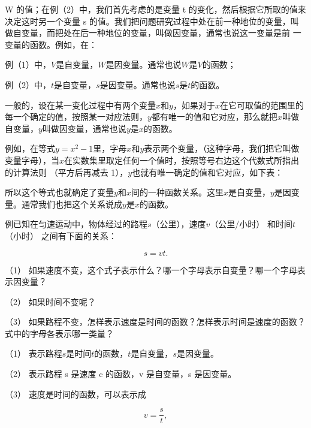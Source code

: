 W 的值；在例（2）中，我们首先考虑的是变量 t
的变化，然后根据它所取的值来决定这时另一个变量 s
的值。我们把问题研究过程中处在前一种地位的变量，叫做自变量，而把处在后一种地位的变量，叫做因变量，通常也说这一变量是前
一变量的函数。例如，在：

例（1）中，\(V\)是自变量，\(W\)是因变量。通常也说\(W\)是\(V\)的函数；

例（2）中，\(t\)是自变量，\(s\)是因变量。通常也说\(s\)是\(t\)的函数。

一般的，设在某一变化过程中有两个变量\(x\)和\(y\)，如果对于\(x\)在它可取值的范围里的每一个确定的值，按照某一对应法则，\(y\)都有唯一的值和它对应，那么就把\(x\)叫做自变量，\(y\)叫做因变量，通常也说\(y\)是\(x\)的函数。

例如，在等式\(y = x^2 - 1\)里，字母\(x\)和\(y\)表示两个变量，（这种字母，我们把它叫做变量字母），当\(x\)在实数集里取定任何一个值时，按照等号右边这个代数式所指出的计算法则
（平方后再减去 1），\(y\)也就有唯一确定的值和它对应，如下表：

{\centering
\small\setlength{\tabcolsep}{3pt}%
\par
}

所以这个等式也就确定了变量\(y\)和\(x\)间的一种函数关系。这里\(x\)是自变量，\(y\)是因变量。通常我们也把这个关系说成\(y\)是\(x\)的函数。

例已知在匀速运动中，物体经过的路程\(s\)（公里），速度\(v\)（公里/小时）
和时间\(t\)（小时） 之间有下面的关系：

\[
s = v t.
\]

（1）
如果速度不变，这个式子表示什么？哪一个字母表示自变量？哪一个字母表示因变量？

（2） 如果时间不变呢？

（3）
如果路程不变，怎样表示速度是时间的函数？怎样表示时间是速度的函数？式中的字母各表示哪一类量？

 （1）
表示路程\(s\)是时间\(t\)的函数，\(t\)是自变量，\(s\)是因变量。

（2） 表示路程 s 是速度 c 的函数，v 是自变量，s 是因变量。

（3） 速度是时间的函数，可以表示成

\[
v = \frac{s}{t},
\]

